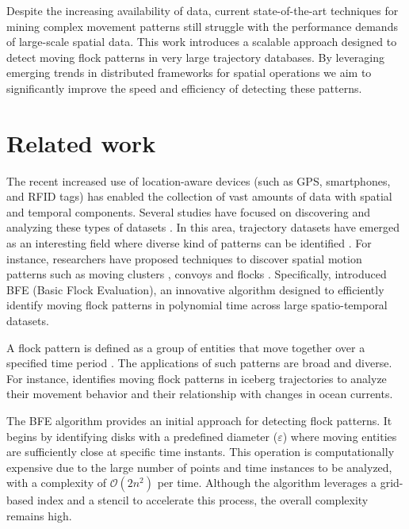 Despite the increasing availability of data, current state-of-the-art techniques for mining complex movement patterns still struggle with the performance demands of large-scale spatial data. This work introduces a scalable approach designed to detect moving flock patterns in very large trajectory databases. By leveraging emerging trends in distributed frameworks for spatial operations we aim to significantly improve the speed and efficiency of detecting these patterns.

\section{Related work}
The recent increased use of location-aware devices (such as GPS, smartphones, and RFID tags) has enabled the collection of vast amounts of data with spatial and temporal components.  Several studies have focused on discovering and analyzing these types of datasets \cite{leung_knowledge_2010, miller_geographic_2001}.  In this area, trajectory datasets have emerged as an interesting field where diverse kind of patterns can be identified \cite{zheng_computing_2011, vieira_spatio-temporal_2013}.  For instance, researchers have proposed techniques to discover spatial motion patterns such as moving clusters \cite{kalnis_discovering_2005}, convoys \cite{jeung_discovery_2008} and flocks \cite{benkert_reporting_2008, gudmundsson_computing_2006}.  Specifically, \cite{vieira_2009} introduced BFE (Basic Flock Evaluation), an innovative algorithm designed to efficiently identify moving flock patterns in polynomial time across large spatio-temporal datasets.

A flock pattern is defined as a group of entities that move together over a specified time period \cite{benkert_reporting_2008}. The applications of such patterns are broad and diverse. For instance, \cite{calderon_romero_mining_2011} identifies moving flock patterns in iceberg trajectories to analyze their movement behavior and their relationship with changes in ocean currents.

The BFE algorithm provides an initial approach for detecting flock patterns. It begins by identifying disks with a predefined diameter ($\varepsilon$) where moving entities are sufficiently close at specific time instants. This operation is computationally expensive due to the large number of points and time instances to be analyzed, with a complexity of $\mathcal{O}(2n^2)$ per time. Although the algorithm leverages a grid-based index and a stencil to accelerate this process, the overall complexity remains high.


